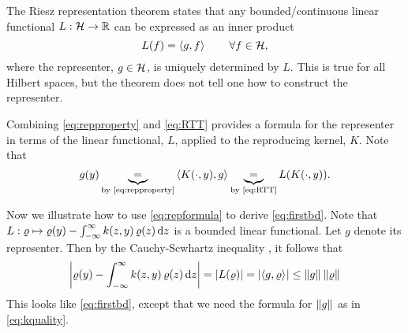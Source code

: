 \documentclass[letterpaper]{amsart}
\begin{document}
The Riesz representation theorem \cite{RieszWiki} states that any bounded/continuous linear functional $L:\mathcal{H} \to \mathbb{R}$ can be expressed as an inner product
\begin{equation}\label{eq:RTT}
L(f) = \left \langle g, f \right \rangle_{{}} \qquad \forall f \in \mathcal{H},
\end{equation}
where the representer, $g \in \mathcal{H}$, is uniquely determined by $L$.  This is true for all Hilbert spaces, but the theorem does not tell one how to construct the representer.

Combining \eqref{eq:repproperty} and \eqref{eq:RTT} provides a formula for the representer in terms of the linear functional, $L$, applied to the reproducing kernel, $K$.  Note that
\begin{equation} \label{eq:repformula}
    g(y) \underbrace{=}_{\text{by \eqref{eq:repproperty}}} \left \langle K(\cdot, y), g \right \rangle_{{}} 
    \underbrace{=}_{\text{by \eqref{eq:RTT}}} L(K(\cdot,y)) .
\end{equation}

Now we illustrate how to use \eqref{eq:repformula} to derive \eqref{eq:firstbd}.  Note that $L: \varrho \mapsto \varrho(y) - \int_{-\infty}^{\infty} k(z,y) \, \varrho(z) \, {\rm d} z$ is a bounded linear functional.  Let $g$ denote its representer.  Then by the Cauchy-Scwhartz inequality \cite{CauchySchwarzWiki}, it follows that 
\begin{equation}
    \left \lvert \varrho(y) - \int_{-\infty}^{\infty} k(z,y) \, \varrho(z) \, {\rm d} z \right \rvert = \left \lvert L(\varrho) \right \rvert = \left \lvert \left \langle g, \varrho \right \rangle_{{}} \right \rvert \le \left \lVert g \right \rVert_{{}}\left \lVert \varrho \right \rVert_{{}}
\end{equation}
This looks like  \eqref{eq:firstbd}, except that we need the formula for $\left \lVert g \right \rVert_{{}}$ as in \eqref{eq:kquality}.  
\end{document}

